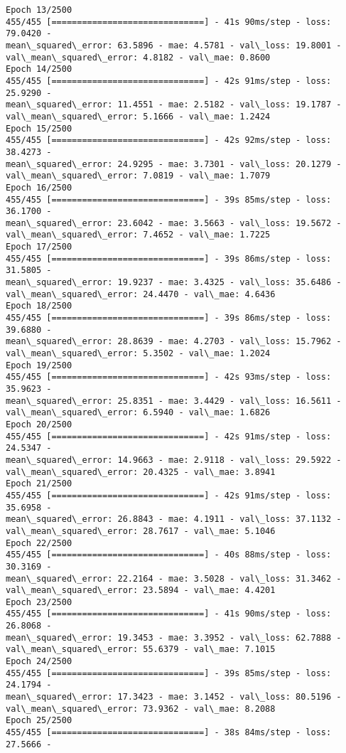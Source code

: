 \documentclass[11pt]{article}
\begin{document}
\begin{Verbatim}[commandchars=\\\{\}]
Epoch 13/2500
455/455 [==============================] - 41s 90ms/step - loss: 79.0420 -
mean\_squared\_error: 63.5896 - mae: 4.5781 - val\_loss: 19.8001 -
val\_mean\_squared\_error: 4.8182 - val\_mae: 0.8600
Epoch 14/2500
455/455 [==============================] - 42s 91ms/step - loss: 25.9290 -
mean\_squared\_error: 11.4551 - mae: 2.5182 - val\_loss: 19.1787 -
val\_mean\_squared\_error: 5.1666 - val\_mae: 1.2424
Epoch 15/2500
455/455 [==============================] - 42s 92ms/step - loss: 38.4273 -
mean\_squared\_error: 24.9295 - mae: 3.7301 - val\_loss: 20.1279 -
val\_mean\_squared\_error: 7.0819 - val\_mae: 1.7079
Epoch 16/2500
455/455 [==============================] - 39s 85ms/step - loss: 36.1700 -
mean\_squared\_error: 23.6042 - mae: 3.5663 - val\_loss: 19.5672 -
val\_mean\_squared\_error: 7.4652 - val\_mae: 1.7225
Epoch 17/2500
455/455 [==============================] - 39s 86ms/step - loss: 31.5805 -
mean\_squared\_error: 19.9237 - mae: 3.4325 - val\_loss: 35.6486 -
val\_mean\_squared\_error: 24.4470 - val\_mae: 4.6436
Epoch 18/2500
455/455 [==============================] - 39s 86ms/step - loss: 39.6880 -
mean\_squared\_error: 28.8639 - mae: 4.2703 - val\_loss: 15.7962 -
val\_mean\_squared\_error: 5.3502 - val\_mae: 1.2024
Epoch 19/2500
455/455 [==============================] - 42s 93ms/step - loss: 35.9623 -
mean\_squared\_error: 25.8351 - mae: 3.4429 - val\_loss: 16.5611 -
val\_mean\_squared\_error: 6.5940 - val\_mae: 1.6826
Epoch 20/2500
455/455 [==============================] - 42s 91ms/step - loss: 24.5347 -
mean\_squared\_error: 14.9663 - mae: 2.9118 - val\_loss: 29.5922 -
val\_mean\_squared\_error: 20.4325 - val\_mae: 3.8941
Epoch 21/2500
455/455 [==============================] - 42s 91ms/step - loss: 35.6958 -
mean\_squared\_error: 26.8843 - mae: 4.1911 - val\_loss: 37.1132 -
val\_mean\_squared\_error: 28.7617 - val\_mae: 5.1046
Epoch 22/2500
455/455 [==============================] - 40s 88ms/step - loss: 30.3169 -
mean\_squared\_error: 22.2164 - mae: 3.5028 - val\_loss: 31.3462 -
val\_mean\_squared\_error: 23.5894 - val\_mae: 4.4201
Epoch 23/2500
455/455 [==============================] - 41s 90ms/step - loss: 26.8068 -
mean\_squared\_error: 19.3453 - mae: 3.3952 - val\_loss: 62.7888 -
val\_mean\_squared\_error: 55.6379 - val\_mae: 7.1015
Epoch 24/2500
455/455 [==============================] - 39s 85ms/step - loss: 24.1794 -
mean\_squared\_error: 17.3423 - mae: 3.1452 - val\_loss: 80.5196 -
val\_mean\_squared\_error: 73.9362 - val\_mae: 8.2088
Epoch 25/2500
455/455 [==============================] - 38s 84ms/step - loss: 27.5666 -

\end{Verbatim}
\end{document}
